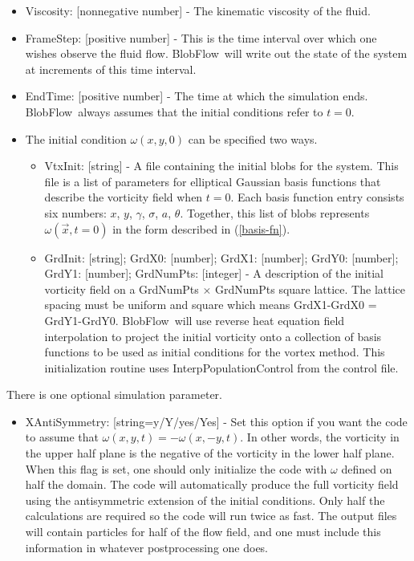 \documentclass[12pt]{report}
\def\v#1{\vec{#1}}
\newcommand{\eqnn}[1]{(\ref{#1})}
\newcommand{\BF}{BlobFlow}
\begin{document}
\begin{itemize}

\item Viscosity: [nonnegative number] - The kinematic viscosity of the fluid.

\item FrameStep: [positive number] - This is the time interval over which one
wishes observe
the fluid flow.  \BF~will write out the state of the system at
increments of this time interval.

\item EndTime: [positive number] - The time at which the simulation ends. 
\BF~always
assumes that the initial conditions refer to $t=0$.

\item The initial condition $\omega(x,y,0)$ can be specified two ways.

\begin{itemize}

\item VtxInit: [string] - A file containing the initial blobs for the system.
This file is a list of parameters for elliptical Gaussian basis
functions that describe the vorticity field when $t=0$.  Each basis function
entry consists six numbers: $x$, $y$, $\gamma$, $\sigma$, $a$, $\theta$.
Together, this list of blobs represents $\omega (\v x,t=0)$ in the form
described in \eqnn{basis-fn}.

\item GrdInit: [string]; GrdX0: [number]; GrdX1: [number]; GrdY0: [number];
GrdY1: [number]; GrdNumPts: [integer] - A description of the initial vorticity
field on a GrdNumPts $\times$ GrdNumPts square lattice.  The lattice spacing
must be uniform and square which means GrdX1-GrdX0 = GrdY1-GrdY0.  \BF~will use
reverse heat equation field interpolation to project the initial vorticity onto
a collection of basis functions to be used as initial conditions for the vortex
method.  This initialization routine uses InterpPopulationControl from the
control file.

\end{itemize}

\end{itemize}

There is one optional simulation parameter.

\begin{itemize}

\item XAntiSymmetry: [string=y/Y/yes/Yes] - Set this option if you want the code
to assume that $\omega(x,y,t) = -\omega(x,-y,t)$.  In other words, the vorticity
in the upper half plane is the
negative of the vorticity in the lower half plane.  When this flag is set, one
should only initialize the code with
$\omega$ defined on half the domain.  The code will automatically produce the
full vorticity field using the antisymmetric extension of the initial
conditions.  Only half the
calculations are
required so the code will run twice as fast.  The output files will
contain particles for half of the flow field, and one must include this
information in whatever postprocessing one does.  

\end{itemize}
\end{document}
